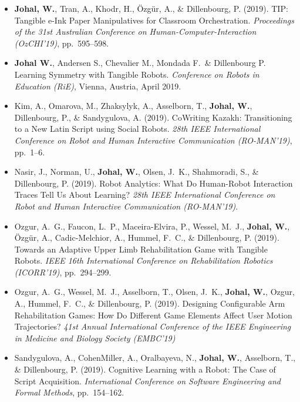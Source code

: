 \begin{itemize}[nosep]
    \item \textbf{Johal, W.}, Tran, A., Khodr, H., Özgür, A., \& Dillenbourg, P. (2019). TIP: Tangible e-Ink Paper Manipulatives for Classroom Orchestration. \textit{Proceedings of the 31st Australian Conference on Human-Computer-Interaction (OzCHI'19)}, pp.\ 595--598.

    \item \textbf{Johal W.}, Andersen S., Chevalier M., Mondada F.\ \& Dillenbourg P. Learning Symmetry with Tangible Robots. \textit{Conference on Robots in Education (RiE)}, Vienna, Austria, April 2019.

    \item Kim, A., Omarova, M., Zhaksylyk, A., Asselborn, T., \textbf{Johal, W.}, Dillenbourg, P., \& Sandygulova, A. (2019). CoWriting Kazakh: Transitioning to a New Latin Script using Social Robots. \textit{28th IEEE International Conference on Robot and Human Interactive Communication (RO-MAN'19)}, pp.\ 1--6.

    \item Nasir, J., Norman, U., \textbf{Johal, W.}, Olsen, J.\ K., Shahmoradi, S., \& Dillenbourg, P. (2019). Robot Analytics: What Do Human-Robot Interaction Traces Tell Us About Learning? \textit{28th IEEE International Conference on Robot and Human Interactive Communication (RO-MAN'19)}.

    \item Ozgur, A.\ G., Faucon, L.\ P., Maceira-Elvira, P., Wessel, M.\ J., \textbf{Johal, W.}, Özgür, A., Cadic-Melchior, A., Hummel, F.\ C., \& Dillenbourg, P. (2019). Towards an Adaptive Upper Limb Rehabilitation Game with Tangible Robots. \textit{IEEE 16th International Conference on Rehabilitation Robotics (ICORR'19)}, pp.\ 294--299.

    \item Ozgur, A.\ G., Wessel, M.\ J., Asselborn, T., Olsen, J.\ K., \textbf{Johal, W.}, Ozgur, A., Hummel, F.\ C., \& Dillenbourg, P. (2019). Designing Configurable Arm Rehabilitation Games: How Do Different Game Elements Affect User Motion Trajectories? \textit{41st Annual International Conference of the IEEE Engineering in Medicine and Biology Society (EMBC'19)}

    \item Sandygulova, A., CohenMiller, A., Oralbayeva, N., \textbf{Johal, W.}, Asselborn, T., \& Dillenbourg, P. (2019). Cognitive Learning with a Robot: The Case of Script Acquisition. \textit{International Conference on Software Engineering and Formal Methods}, pp.\ 154--162.


\end{itemize}
